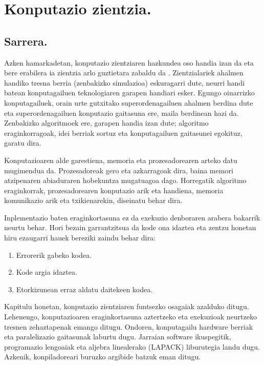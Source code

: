 \chapter{Konputazio zientzia.}


\section{Sarrera.}

Azken hamarkadetan,  konputazio zientziaren hazkundea oso handia izan da eta bere erabilera ia zientzia arlo guztietara zabaldu da \cite{Goedecker2001}. Zientzialariek ahalmen handiko tresna berria (zenbakizko simulazioa) eskuragarri dute, neurri handi batean konputagailuen teknologiaren garapen handiari esker. Egungo oinarrizko konputagailuek, orain urte gutxitako superordenagailuen ahalmen berdina dute eta superordenagailuen konputazio gaitasuna ere, maila berdinean hazi da. Zenbakizko algoritmoek ere, garapen handia izan dute; algoritmo eraginkorragoak, idei berriak sortuz eta konputagailuen gaitasunei egokituz, garatu dira.

Konputazioaren alde garestiena, memoria eta prozesadorearen arteko datu mugimendua da. Prozesadoreak gero eta azkarragoak dira, baina memori atzipenaren abiaduraren hobekuntza mugatuagoa dago. Horregatik algoritmo eraginkorrak, prozesadorearen konputazio arik eta handiena,  memoria komunikazio arik eta txikienarekin, diseinatu behar dira.      
 
Inplementazio baten eraginkortasuna ez da exekuzio denboraren arabera bakarrik neurtu behar. Hori bezain garrantzitsua da kode ona idaztea \cite{Wilson2014} eta zentzu honetan hiru ezaugarri hauek bereziki zaindu behar dira:
\begin{enumerate}
\item Errorerik gabeko kodea.
\item Kode argia idaztea.
\item Etorkizunean erraz aldatu daitekeen kodea.
\end{enumerate}

Kapitulu honetan,  konputazio zientziaren funtsezko osagaiak azalduko ditugu. Lehenengo, konputazioaren eraginkortasuna aztertzeko eta exekuzioak neurtzeko tresnen zehaztapenak emango ditugu. Ondoren, konputagailu hardware berriak eta paralelizazio gaitasunak laburtu dugu. Jarraian software ikuspegitik, programazio lengoaiak eta aljebra linealerako (LAPACK) liburutegia landu dugu. Azkenik, konpiladoreari buruzko argibide batzuk eman ditugu.

